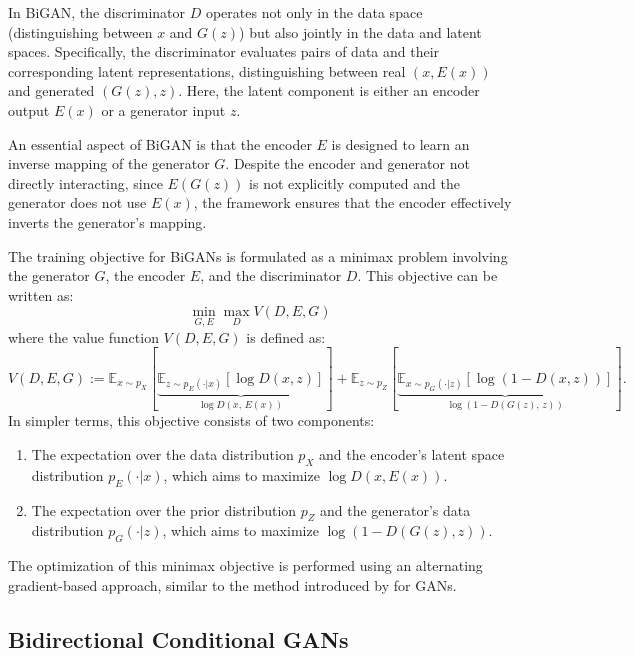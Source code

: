 In BiGAN, the discriminator \( D \) operates not only in the data space
(distinguishing between \( x \) and \( G(z) \)) but also jointly in the
data and latent spaces. Specifically, the discriminator evaluates pairs
of data and their corresponding latent representations, distinguishing
between real \( (x, E(x)) \) and generated \( (G(z), z) \).
Here, the latent component is either an encoder output \( E(x) \) 
or a generator input \( z \).

An essential aspect of BiGAN is that the encoder \( E \) is designed
to learn an inverse mapping of the generator \( G \).
Despite the encoder and generator not directly interacting, since
\( E(G(z)) \) is not explicitly computed and the generator does not use
\( E(x) \), the framework ensures that the encoder effectively inverts
the generator's mapping.

The training objective for BiGANs is formulated as a minimax problem involving the generator \( G \), the encoder \( E \), and the discriminator \( D \). This objective can be written as:
\[
\min_{G, E} \max_{D} V(D, E, G)
\]
where the value function \( V(D, E, G) \) is defined as:
\begin{equation}
V(D, E, G) := \mathbb{E}_{x \sim p_X} [ \underset{\log D(x,\, E(x)) }{\underbrace{\mathbb{E}_{z \sim p_E(\cdot | x)} \left[ \log D(x, z) \right]}}  ] +
\mathbb{E}_{z \sim p_Z} [ \underset{\log(1 - D(G(z),\, z))}{\underbrace{\mathbb{E}_{x \sim p_G(\cdot | z)} \left[ \log(1 - D(x, z)) \right]}} ].
\end{equation}
In simpler terms, this objective consists of two components:
\begin{enumerate}
    \item The expectation over the data distribution \( p_X \)
    and the encoder's latent space distribution \( p_E(\cdot | x) \),
    which aims to maximize \( \log D(x, E(x)) \).
    \item The expectation over the prior distribution \( p_Z \)
    and the generator's data distribution \( p_G(\cdot | z) \),
    which aims to maximize \( \log(1 - D(G(z), z)) \).
\end{enumerate}

The optimization of this minimax objective is performed
using an alternating gradient-based approach, similar to the method
introduced by \cite{goodfellow2014} for GANs.

\subsection{Bidirectional Conditional GANs}
\label{sec:bicogan}

